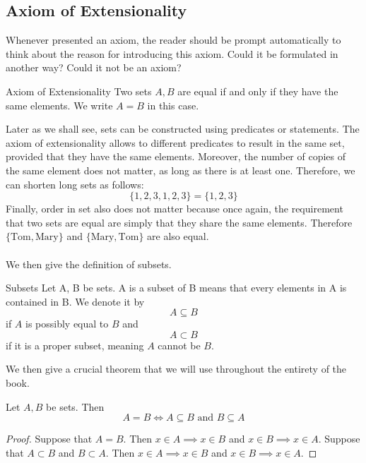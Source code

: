 \subsection{Axiom of Extensionality}
Whenever presented an axiom, the reader should be prompt automatically to think about the reason for introducing this axiom. Could it be formulated in another way? Could it not be an axiom? 

\begin{axm}{Axiom of Extensionality}{} Two sets $A,B$ are equal if and only if they have the same elements. We write $A=B$ in this case. 
\end{axm}

Later as we shall see, sets can be constructed using predicates or statements. The axiom of extensionality allows to different predicates to result in the same set, provided that they have the same elements. Moreover, the number of copies of the same element does not matter, as long as there is at least one. Therefore, we can shorten long sets as follows: $$\{1,2,3,1,2,3\}=\{1,2,3\}$$ Finally, order in set also does not matter because once again, the requirement that two sets are equal are simply that they share the same elements. Therefore $\{\text{Tom}, \text{Mary}\}$ and $\{\text{Mary}, \text{Tom}\}$ are also equal. \\~\\

We then give the definition of subsets. 

\begin{defn}{Subsets}{} Let A, B be sets. A is a subset of B means that every elements in A is contained in B. We denote it by $$A\subseteq B$$ if $A$ is possibly equal to $B$ and $$A\subset B$$ if it is a proper subset, meaning $A$ cannot be $B$. 
\end{defn}

We then give a crucial theorem that we will use throughout the entirety of the book. 

\begin{thm}{}{} Let $A,B$ be sets. Then $$A=B\iff A\subseteq B\text{ and }B\subseteq A$$\tcbline
\begin{proof} Suppose that $A=B$. Then $x\in A\implies x\in B$ and $x\in B\implies x\in A$. Suppose that $A\subset B$ and $B\subset A$. Then $x\in A\implies x\in B$ and $x\in B\implies x\in A$. 
\end{proof}
\end{thm}

